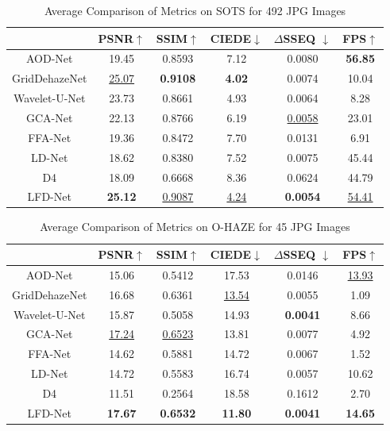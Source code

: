 \documentclass[lettersize,journal]{IEEEtran}
\begin{document}
\begin{table}[p!th]
    \caption{Average Comparison of Metrics on SOTS for 492 JPG Images\label{tab:sots}}
    \centering
    \begin{tabular}{cccccc}
    \hline
    &PSNR$\uparrow$ & SSIM$\uparrow$ & CIEDE$\downarrow$ & $\Delta$SSEQ $\downarrow$ & FPS$\uparrow$ \\
    \hline
    AOD-Net                 & 19.45 & 0.8593 & 7.12 & 0.0080 & \textbf{56.85} \\
    GridDehazeNet           & \underline{25.07} & \textbf{0.9108} & \textbf{4.02} & 0.0074 & 10.04 \\
    Wavelet-U-Net           & 23.73 & 0.8661 & 4.93 & 0.0064 &  8.28 \\
    GCA-Net                 & 22.13 & 0.8766 & 6.19 & \underline{0.0058} & 23.01 \\    
    FFA-Net                 & 19.36 & 0.8472 & 7.70 & 0.0131 &  6.91 \\
    LD-Net                  & 18.62 & 0.8380 & 7.52 & 0.0075 & 45.44 \\
    D4                      & 18.09 & 0.6668 & 8.36 & 0.0624 & 44.79 \\
    LFD-Net                 & \textbf{25.12} & \underline{0.9087} & \underline{4.24} & \textbf{0.0054} & \underline{54.41} \\
    \hline
    \end{tabular}
\end{table}

\begin{table}[p!th]
    \caption{Average Comparison of Metrics on O-HAZE for 45 JPG Images\label{tab:ohaze}}
    \centering
    \begin{tabular}{cccccc}
    \hline
    &PSNR$\uparrow$ & SSIM$\uparrow$ & CIEDE$\downarrow$ & $\Delta$SSEQ $\downarrow$ & FPS$\uparrow$ \\
    \hline
    AOD-Net        & 15.06 & 0.5412 & 17.53 & 0.0146 & \underline{13.93} \\
    GridDehazeNet  & 16.68 & 0.6361 & \underline{13.54} & 0.0055 & 1.09 \\
    Wavelet-U-Net  & 15.87 & 0.5058 & 14.93 & \textbf{0.0041} & 8.66\\
    GCA-Net        & \underline{17.24} & \underline{0.6523} & 13.81 & 0.0077 & 4.92 \\    
    FFA-Net        & 14.62 & 0.5881 & 14.72 & 0.0067 & 1.52\\
    LD-Net         & 14.72 & 0.5583 & 16.74 & 0.0057 & 10.62 \\
    D4             & 11.51 & 0.2564 & 18.58 & 0.1612 & 2.70 \\
    LFD-Net        & \textbf{17.67} & \textbf{0.6532} & \textbf{11.80} & \textbf{0.0041} & \textbf{14.65}\\
    \hline
    \end{tabular}
\end{table}
\end{document}
